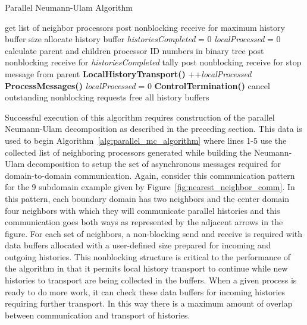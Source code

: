 \begin{algorithm}[h!]
  \caption{Parallel Neumann-Ulam Algorithm}
  \label{alg:parallel_mc_algorithm}
  \begin{algorithmic}[1]
    \State get list of neighbor processors 
    \State post nonblocking receive for maximum history buffer size
    \State allocate history buffer
    \EndFor
    \State \textit{historiesCompleted} = 0
    \State \textit{localProcessed} = 0
    \State calculate parent and children processor ID numbers in
    binary tree
    \State post nonblocking receive for \textit{historiesCompleted} tally
    \EndFor
    \State post nonblocking receive for stop message from parent
    \State \textbf{LocalHistoryTransport()}
    \State ++\textit{localProcessed}
    \EndIf
    \State \textbf{ProcessMessages()}
    \State \textit{localProcessed} = 0
    \EndIf
    \State \textbf{ControlTermination()}
    \EndIf
    \EndWhile
    \State cancel outstanding nonblocking requests
    \State free all history buffers
  \end{algorithmic}
\end{algorithm}

Successful execution of this algorithm requires construction of the
parallel Neumann-Ulam decomposition as described in the preceding
section. This data is used to begin
Algorithm~\ref{alg:parallel_mc_algorithm} where lines 1-5 use the
collected list of neighboring processors generated while building the
Neumann-Ulam decomposition to setup the set of asynchronous messages
required for domain-to-domain communication. Again, consider this
communication pattern for the 9 subdomain example given by
Figure~\ref{fig:nearest_neighbor_comm}. In this pattern, each boundary
domain has two neighbors and the center domain four neighbors with
which they will communicate parallel histories and this communication
goes both ways as represented by the adjacent arrows in the
figure. For each set of neighbors, a non-blocking send and receive is
required with data buffers allocated with a user-defined size prepared
for incoming and outgoing histories. This nonblocking structure is
critical to the performance of the algorithm in that it permits local
history transport to continue while new histories to transport are
being collected in the buffers. When a given process is ready to do
more work, it can check these data buffers for incoming histories
requiring further transport. In this way there is a maximum amount of
overlap between communication and transport of histories.

